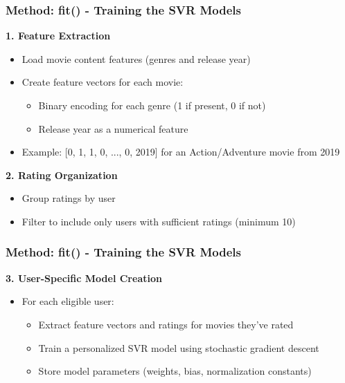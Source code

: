\documentclass{beamer}
\begin{document}
\begin{frame}
\frametitle{Method: fit() - Training the SVR Models}

    \textbf{1. Feature Extraction}
    \begin{itemize}
        \item Load movie content features (genres and release year)
        \item Create feature vectors for each movie:
        \begin{itemize}
            \item Binary encoding for each genre (1 if present, 0 if not)
            \item Release year as a numerical feature
        \end{itemize}
        \item Example: [0, 1, 1, 0, ..., 0, 2019] for an Action/Adventure movie from 2019
    \end{itemize}

    \vspace{0.5cm}
    
    \textbf{2. Rating Organization}
    \begin{itemize}
        \item Group ratings by user
        \item Filter to include only users with sufficient ratings (minimum 10)
    \end{itemize}
\end{frame}

\begin{frame}
\frametitle{Method: fit() - Training the SVR Models}
    \textbf{3. User-Specific Model Creation}
    \begin{itemize}
        \item For each eligible user:
        \begin{itemize}
            \item Extract feature vectors and ratings for movies they've rated
            \item Train a personalized SVR model using stochastic gradient descent
            \item Store model parameters (weights, bias, normalization constants)
        \end{itemize}
    \end{itemize}
\end{frame}
\end{document}
